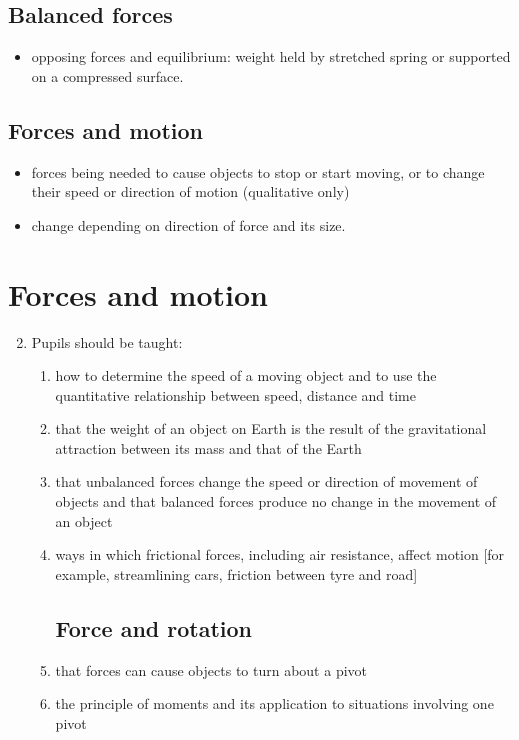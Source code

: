 \documentclass[10pt]{article}
\begin{document}
\begin{paracol}{2}
\subsection{Balanced forces}
\begin{itemize}
\item opposing forces and equilibrium: weight held by stretched spring or supported on a
compressed surface.
\end{itemize}

\subsection{Forces and motion}
\begin{itemize}
\item forces being needed to cause objects to stop or start moving, or to change their speed
or direction of motion (qualitative only)
\item change depending on direction of force and its size.
\end{itemize}

\switchcolumn

\section{Forces and motion}
\begin{enumerate}
\setcounter{enumi}{1}
\item Pupils should be taught:
\begin{enumerate}
\subsection{Force and linear motion}
\item how to determine the speed of a moving object and to use the quantitative
relationship between speed, distance and time
\item that the weight of an object on Earth is the result of the gravitational
attraction between its mass and that of the Earth
\item that unbalanced forces change the speed or direction of movement of
objects and that balanced forces produce no change in the movement 
of an object
\item ways in which frictional forces, including air resistance, affect motion 
[for example, streamlining cars, friction between tyre and road]
\subsection{Force and rotation}
\item that forces can cause objects to turn about a pivot
\item the principle of moments and its application to situations involving one pivot

\end{enumerate}
\end{enumerate}
\end{paracol}
\end{document}
